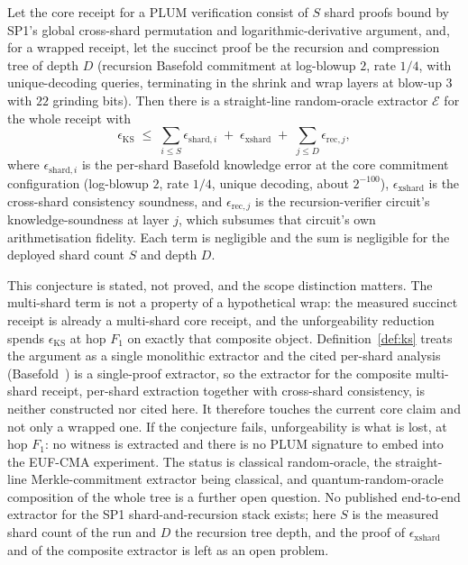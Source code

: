 \begin{conjecture}\label{conj:extract-recursion}
    Let the core receipt for a PLUM verification consist of $S$ shard proofs bound by SP1's global cross-shard permutation and logarithmic-derivative argument, and, for a wrapped receipt, let the succinct proof be the recursion and compression tree of depth $D$ (recursion Basefold commitment at log-blowup $2$, rate $1/4$, with unique-decoding queries, terminating in the shrink and wrap layers at blow-up $3$ with $22$ grinding bits). Then there is a straight-line random-oracle extractor $\mathcal E$ for the whole receipt with
    \begin{equation*}
      \epsilon_{\mathrm{KS}}\;\le\;\sum_{i\le S}\epsilon_{\mathrm{shard},i}
      \;+\;\epsilon_{\mathrm{xshard}}\;+\;\sum_{j\le D}\epsilon_{\mathrm{rec},j},
    \end{equation*}
    where $\epsilon_{\mathrm{shard},i}$ is the per-shard Basefold knowledge error at the core commitment configuration (log-blowup $2$, rate $1/4$, unique decoding, about $2^{-100}$), $\epsilon_{\mathrm{xshard}}$ is the cross-shard consistency soundness, and $\epsilon_{\mathrm{rec},j}$ is the recursion-verifier circuit's knowledge-soundness at layer $j$, which subsumes that circuit's own arithmetisation fidelity. Each term is negligible and the sum is negligible for the deployed shard count $S$ and depth $D$.
\end{conjecture}

This conjecture is stated, not proved, and the scope distinction matters. The multi-shard term is not a property of a hypothetical wrap: the measured succinct receipt is already a multi-shard core receipt, and the unforgeability reduction spends $\epsilon_{\mathrm{KS}}$ at hop $F_1$ on exactly that composite object. Definition~\ref{def:ks} treats the argument as a single monolithic extractor and the cited per-shard analysis (Basefold~\cite{basefold2023}) is a single-proof extractor, so the extractor for the composite multi-shard receipt, per-shard extraction together with cross-shard consistency, is neither constructed nor cited here. It therefore touches the current core claim and not only a wrapped one. If the conjecture fails, unforgeability is what is lost, at hop $F_1$: no witness is extracted and there is no PLUM signature to embed into the EUF-CMA experiment. The status is classical random-oracle, the straight-line Merkle-commitment extractor being classical, and quantum-random-oracle composition of the whole tree is a further open question. No published end-to-end extractor for the SP1 shard-and-recursion stack exists; here $S$ is the measured shard count of the run and $D$ the recursion tree depth, and the proof of $\epsilon_{\mathrm{xshard}}$ and of the composite extractor is left as an open problem.

